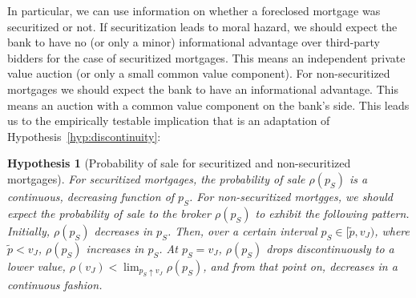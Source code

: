 \documentclass[11pt,twopage]{article}
\newtheorem{conjecture}{Hypothesis}
{\bf}{\it}
\begin{document}
In particular, we can use information on whether a foreclosed mortgage was securitized or not. If securitization leads to moral hazard, we should expect the bank to have no (or only a minor) informational advantage over third-party bidders for the case of securitized mortgages. This means an independent private value auction (or only a small common value component). For non-securitized mortgages we should expect the bank to have an informational advantage. This means an auction with a common value component on the bank's side.
This leads us to the empirically testable implication that is an adaptation of Hypothesis~\ref{hyp:discontinuity}:

\begin{conjecture}[Probability of sale for securitized and non-securitized mortgages]\label{hyp:discontinuity-sec-nonsec}
	For securitized mortgages, the probability of sale $\rho(p_S)$ is a continuous, decreasing function of $p_S$. For non-securitized mortgges, we should expect the probability of sale to the broker $\rho(p_S)$ to exhibit the following pattern. Initially, $\rho(p_S)$ decreases in $p_S$. Then, over a certain interval $p_S \in [\tilde p, v_J)$, where $\tilde p < v_J$, $\rho(p_S)$ increases in $p_S$. At $p_S = v_J$, $\rho(p_S)$ drops discontinuously to a lower value, $\rho(v_J)<\lim_{p_S \uparrow v_J} \rho(p_S)$, and from that point on, decreases in a continuous fashion.
\end{conjecture}

%
\end{document}
